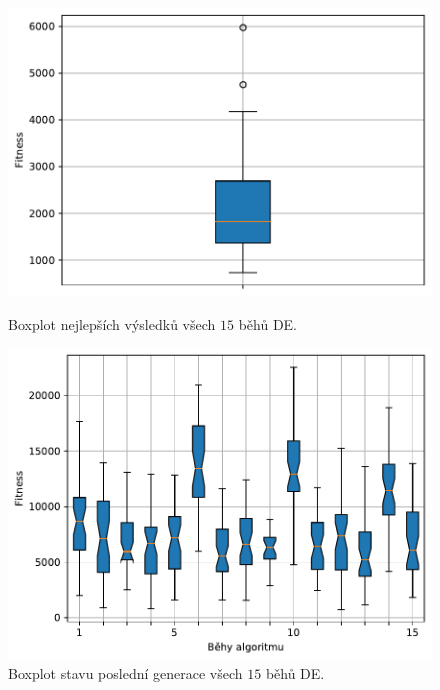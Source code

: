 \begin{figure}[H]
\begin{minipage}[t]{0.475\linewidth}
\includegraphics[width=\linewidth]{obrazky-figures/statistics/HIFU/blob/20/DE/bestsBoxplot_WithOutliers.pdf}
\caption{Boxplot nejlepších výsledků všech $15$ běhů DE.}
\label{fg:hifu:blob:de:best}
\end{minipage}
\hfill
\begin{minipage}[t]{0.475\linewidth}
\includegraphics[width=\linewidth]{obrazky-figures/statistics/HIFU/blob/20/DE/lastGenBoxplots.pdf}
\caption{Boxplot stavu poslední generace všech $15$ běhů DE.}
\label{fg:hifu:blob:de:lastGen}
\end{minipage}
\end{figure}


